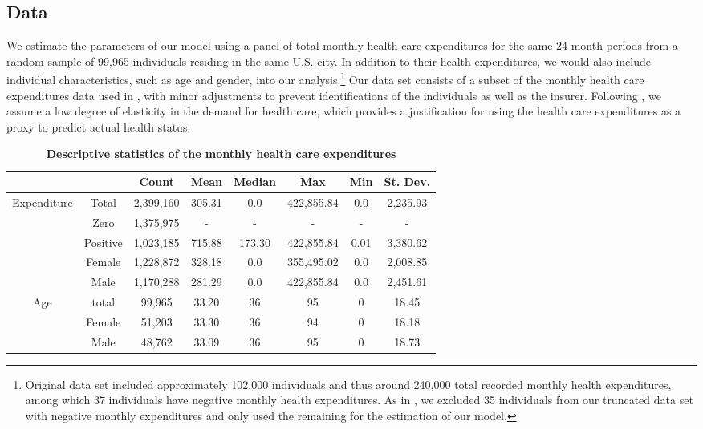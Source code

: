 \documentclass[letterpaper,12pt]{article}
\theoremstyle{definition}
\begin{document}
\begin{spacing}{1.5}{}
\section{Data}\label{SecData}

    We estimate the parameters of our model using a panel of total monthly health care expenditures for the same 24-month periods from a random sample of 99,965 individuals residing in the same U.S. city. In addition to their health expenditures, we would also include individual characteristics, such as age and gender, into our analysis.\footnote{Original data set included approximately 102,000 individuals and thus around 240,000 total recorded monthly health expenditures, among which 37 individuals have negative monthly health expenditures. As in \citet{evans}, we excluded 35 individuals from our truncated data set with negative monthly expenditures and only used the remaining for the estimation of our model.} Our data set consists of a subset of the monthly health care expenditures data used in \citet{evans}, with minor adjustments to prevent identifications of the individuals as well as the insurer. Following \citet{evans}, we assume a low degree of elasticity in the demand for health care, which provides a justification for using the health care expenditures as a proxy to predict actual health status.\par
  
  \begin{table}[h!] \centering \captionsetup{width=4.0in}
    \caption{\label{TabDesciprtive}\textbf{Descriptive statistics of the monthly health care expenditures}}
      \begin{tabular}{ c c | c  c  c  c  c  c }
      \hline\hline
        & & Count & Mean & Median & Max & Min & St. Dev. \\
      \hline
      Expenditure & Total & 2,399,160 & 305.31 & 0.0 & 422,855.84 & 0.0 & 2,235.93 \\
       & Zero & 1,375,975 & - & - & - & - & - \\
       & Positive & 1,023,185 & 715.88 & 173.30 & 422,855.84 & 0.01 & 3,380.62 \\
       & Female & 1,228,872 & 328.18 & 0.0 & 355,495.02 & 0.0 & 2,008.85 \\
       & Male & 1,170,288 & 281.29 & 0.0 & 422,855.84 & 0.0 & 2,451.61 \\
      \hline
      Age & total & 99,965 & 33.20 & 36 & 95 & 0 & 18.45 \\
       & Female & 51,203 & 33.30 & 36 & 94 & 0 & 18.18 \\
       & Male & 48,762 & 33.09 & 36 & 95 & 0 & 18.73 \\
      \hline\hline
    \end{tabular}
  \end{table}    


\end{spacing}
\end{document}
